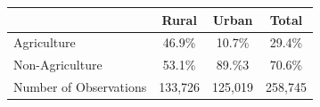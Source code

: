 \begin{tabular*}{0.7\textwidth}{@{\hskip\tabcolsep\extracolsep\fill}l*{3}{c}}
\toprule
            &       Rural&       Urban&       Total\\
\midrule
Agriculture &     46.9\%&     10.7\%&     29.4\%\\
Non-Agriculture&     53.1\%&     89.\%3&     70.6\%\\
Number of Observations&     133,726&     125,019&     258,745\\
\bottomrule
\end{tabular*}
